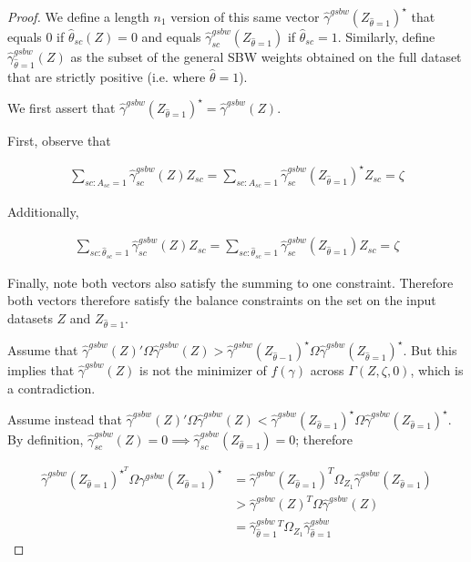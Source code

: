 \begin{proof}
We define a length $n_1$ version of this same vector $\hat{\gamma}^{gsbw}(Z_{\hat{\theta} = 1})^\star$ that equals 0 if $\hat{\theta}_{sc}(Z) = 0$ and equals $\hat{\gamma}^{gsbw}_{sc}(Z_{\hat{\theta} = 1})$ if $\hat{\theta}_{sc} = 1$. Similarly, define $\hat{\gamma}^{gsbw}_{\hat{\theta} = 1}(Z)$ as the subset of the general SBW weights obtained on the full dataset that are strictly positive (i.e. where $\hat{\theta} = 1$).

We first assert that $\hat{\gamma}^{gsbw}(Z_{\hat{\theta} = 1})^\star  = \hat{\gamma}^{gsbw}(Z)$.

First, observe that 

\begin{align*}
\sum_{sc: A_{sc} = 1}\hat{\gamma}_{sc}^{gsbw}(Z) Z_{sc} = \sum_{sc: A_{sc} = 1}\hat{\gamma}^{gsbw}_{sc}(Z_{\hat{\theta} = 1})^\star Z_{sc} = \zeta \end{align*}

Additionally, 

\begin{align*}
 \sum_{sc: \hat{\theta}_{sc} = 1}\hat{\gamma}_{sc}^{gsbw}(Z) Z_{sc} = \sum_{sc: \hat{\theta}_{sc} = 1}\hat{\gamma}_{sc}^{gsbw}(Z_{\hat{\theta} = 1}) Z_{sc} = \zeta   
\end{align*}

Finally, note both vectors also satisfy the summing to one constraint. Therefore both vectors therefore satisfy the balance constraints on the set on the input datasets $Z$ and $Z_{\hat{\theta} = 1}$. 

Assume that $\hat{\gamma}^{gsbw}(Z)'\Omega\hat{\gamma}^{gsbw}(Z) > \hat{\gamma}^{gsbw}(Z_{\hat{\theta} - 1})^\star \Omega\hat{\gamma}^{gsbw}(Z_{\hat{\theta} = 1})^\star$. But this implies that $\hat{\gamma}^{gsbw}(Z)$ is not the minimizer of $f(\gamma)$ across $\Gamma(Z, \zeta, 0)$, which is a contradiction. 

Assume instead that $\hat{\gamma}^{gsbw}(Z)'\Omega\hat{\gamma}^{gsbw}(Z) < \hat{\gamma}^{gsbw}(Z_{\hat{\theta} = 1})^\star \Omega\hat{\gamma}^{gsbw}(Z_{\hat{\theta} = 1})^\star$. By definition, $\hat{\gamma}^{gsbw}_{sc}(Z) = 0 \implies \hat{\gamma}^{gsbw}_{sc}(Z_{\hat{\theta} = 1}) = 0$; therefore 

\begin{align*}
\hat{\gamma}^{gsbw}(Z_{\hat{\theta} = 1})^\star^T\Omega\gamma^{gsbw}(Z_{\hat{\theta} = 1})^\star &= \hat{\gamma}^{gsbw}(Z_{\hat{\theta} = 1})^T\Omega_{Z_1}\hat{\gamma}^{gsbw}(Z_{\hat{\theta} = 1}) \\
&> \hat{\gamma}^{gsbw}(Z)^T\Omega\hat{\gamma}^{gsbw}(Z) \\
&= \hat{\gamma}^{gsbw}_{\hat{\theta} = 1}^T\Omega_{Z_1}\hat{\gamma}^{gsbw}_{\hat{\theta} = 1}    
\end{align*}


\end{proof}
